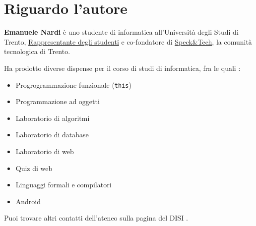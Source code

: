 \section*{Riguardo l'autore}

\textbf{Emanuele Nardi} è uno studente di informatica all'Università degli Studi di Trento, \href{https://www.facebook.com/rappresentantidisi/}{Rappresentante degli studenti} e co-fondatore di \href{http://speckand.tech}{Speck\&Tech}, la comunità tecnologica di Trento.

\medskip
Ha prodotto diverse dispense per il corso di studi di informatica, fra le quali%
\href{https://github.com/emanuelenardi?utf8=%E2%9C%93&tab=repositories&q=latex}{\ExternalLink}:

\begin{itemize}
	\item Progrogrammazione funzionale (\texttt{this})
	\item Programmazione ad oggetti
	\item Laboratorio di algoritmi
	\item Laboratorio di database
	\item Laboratorio di web
	\item Quiz di web
	\item Linguaggi formali e compilatori
	\item Android
\end{itemize}

\medskip
Puoi trovare altri contatti dell'ateneo sulla pagina del DISI%
\href{http://offertaformativa.unitn.it/it/l/informatica/contatti-e-referenti}{\ExternalLink}.

